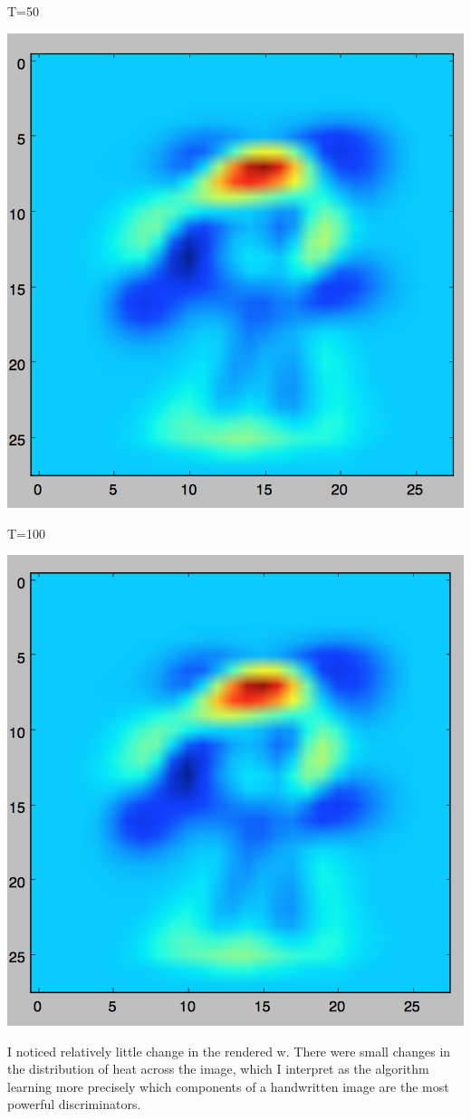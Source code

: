 \documentclass[twoside,11pt]{homework}
\begin{document}
T=50

\includegraphics[scale=.5]{images/w50.png}

T=100

\includegraphics[scale=.5]{images/w100.png}

I noticed relatively little change in the rendered w.
There were small changes in the distribution of heat across the image,
which I interpret as the algorithm learning more precisely which components of a handwritten image are the most powerful discriminators.
\end{document}
